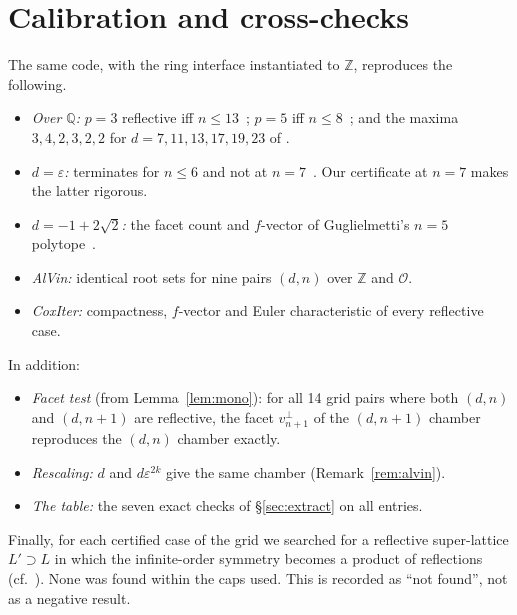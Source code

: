 \documentclass[11pt]{amsart}
\theoremstyle{definition}
\newcommand{\Z}{\mathbb{Z}}
\newcommand{\Q}{\mathbb{Q}}
\newcommand{\OK}{\mathcal{O}}
\newcommand{\eps}{\varepsilon}
\begin{document}
\section{Calibration and cross-checks}\label{sec:calibration}
The same code, with the ring interface instantiated to $\Z$, reproduces the following.
\begin{itemize}
\item \emph{Over $\Q$:} $p=3$ reflective iff $n\le13$~\cite{Mc11}; $p=5$ iff
  $n\le8$~\cite{Mar15}; and the maxima $3,4,2,3,2,2$ for $d=7,11,13,17,19,23$ of
  \cite[Table~3.1]{McTh}.
\item \emph{$d=\eps$:} terminates for $n\le6$ and not at $n=7$~\cite{Bug90}. Our certificate
  at $n=7$ makes the latter rigorous.
\item \emph{$d=-1+2\sqrt2$:} the facet count and $f$-vector of Guglielmetti's $n=5$
  polytope~\cite{Gug17}.
\item \emph{AlVin:} identical root sets for nine pairs $(d,n)$ over $\Z$ and $\OK$.
\item \emph{CoxIter:} compactness, $f$-vector and Euler characteristic of every reflective
  case.
\end{itemize}
In addition:
\begin{itemize}
\item \emph{Facet test} (from Lemma~\ref{lem:mono}): for all 14 grid pairs where both
  $(d,n)$ and $(d,n+1)$ are reflective, the facet $v_{n+1}^\perp$ of the $(d,n+1)$ chamber
  reproduces the $(d,n)$ chamber exactly.
\item \emph{Rescaling:} $d$ and $d\eps^{2k}$ give the same chamber
  (Remark~\ref{rem:alvin}).
\item \emph{The table:} the seven exact checks of \S\ref{sec:extract} on all \NEntries{}
  entries.
\end{itemize}
Finally, for each certified case of the grid we searched for a reflective super-lattice
$L'\supset L$ in which the infinite-order symmetry becomes a product of reflections (cf.\
\cite[Fig.~3.2]{McTh}). None was found within the caps used. This is recorded as ``not found'',
not as a negative result.
\end{document}
